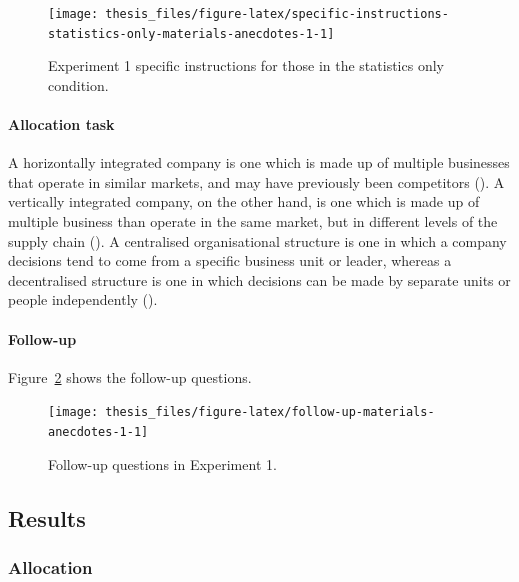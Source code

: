 \documentclass[a4paper, nobind, dvipsnames]{templates/ociamthesis}
\theoremstyle{definition}
\theoremstyle{definition}
\theoremstyle{definition}
\theoremstyle{definition}
\theoremstyle{remark}
\begin{document}
\begin{figure}
\texttt{[image: thesis\_files/figure-latex/specific-instructions-statistics-only-materials-anecdotes-1-1]} \caption{Experiment 1 specific instructions for those in the statistics only condition.}\label{fig:specific-instructions-statistics-only-materials-anecdotes-1}
\end{figure}

\hypertarget{allocation-materials-anecdotes-1}{%
\paragraph{Allocation task}\label{allocation-materials-anecdotes-1}}

A horizontally integrated company is one which is made up of multiple businesses
that operate in similar markets, and may have previously been competitors
(\textcite{gaughan2012}). A vertically integrated company, on the other hand, is one which
is made up of multiple business than operate in the same market, but in
different levels of the supply chain (\textcite{gaughan2012a}). A centralised
organisational structure is one in which a company decisions tend to come from a
specific business unit or leader, whereas a decentralised structure is one in
which decisions can be made by separate units or people independently
(\textcite{kenton2021}).

\hypertarget{follow-up-materials-anecdotes-1}{%
\paragraph{Follow-up}\label{follow-up-materials-anecdotes-1}}

Figure~\ref{fig:follow-up-materials-anecdotes-1} shows the follow-up questions.



\begin{figure}
\texttt{[image: thesis\_files/figure-latex/follow-up-materials-anecdotes-1-1]} \caption{Follow-up questions in Experiment 1.}\label{fig:follow-up-materials-anecdotes-1}
\end{figure}

\hypertarget{results-anecdotes-1-appendix}{%
\subsection{Results}\label{results-anecdotes-1-appendix}}

\subsubsection{Allocation}
\end{document}
